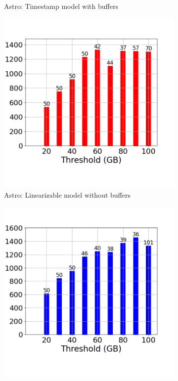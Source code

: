 \begin{figure}
\begin{subfigure}[c]{0.48\textwidth}
		\caption{Astro: Timestamp model with buffers}
		\label{fig:system-ts-50-astro}
	\end{subfigure}
	\begin{subfigure}[c]{0.48\textwidth}
		\includegraphics[width=1\textwidth]	 {figures/Experiments/Dynamic/ASTRO/Batch_processing/50/average_query_time_per_batch_version_999777016_10485760_10_delay[50].png}
		\caption{Astro: Linearizable model without buffers}
		\label{fig:logical-ts-no-50-astro}
	\end{subfigure}
	\begin{subfigure}[c]{0.48\textwidth}
		\includegraphics[width=1\textwidth]	 {figures/Experiments/Dynamic/ASTRO/Batch_processing/50/average_query_time_per_batch_version_999777017_10485760_10_delay[50].png}

\end{subfigure}
\end{figure}
